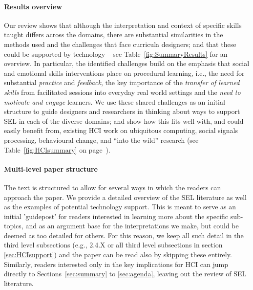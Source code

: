\documentclass[prodmode,acmtochi]{acmsmall}
\begin{document}
\paragraph{Results overview}
Our review shows that although the interpretation and context of specific skills taught differs across the domains, there are substantial similarities in the methods used and the challenges that face curricula designers; and that these could be supported by technology -- see Table~\ref{fig:SummaryResults} for an overview.  
%
In particular, the identified challenges build on the emphasis that social and emotional skills interventions place on procedural learning, i.e., the need for substantial \emph{practice} and \emph{feedback}, the key importance of the \emph{transfer of learned skills} from facilitated sessions into everyday real world settings and the \emph{need to motivate and engage} learners.
%
We use these shared challenges as an initial structure to guide designers and researchers in thinking about ways to support SEL in each of the diverse domains; and show how this fits well with, and could easily benefit from, existing HCI work on ubiquitous computing, social signals processing, behavioural change, and ``into the wild'' research (see Table~\ref{fig:HCIsummary} on page~\pageref{fig:HCIsummary}). 
%

\paragraph{Multi-level paper structure}
The text is structured to allow for several ways in which the readers can approach the paper. We provide a detailed overview of the SEL literature as well as the examples of potential technology support. This is meant to serve as an initial 'guidepost' for readers interested in learning more about the specific sub-topics, and as an argument base for the interpretations we make, but could be deemed as too detailed for others. For this reason, we keep all such detail in the third level subsections (e.g., 2.4.X or all third level subsections in section \ref{sec:HCIsupport}) and the paper can be read also by skipping these entirely. Similarly, readers interested only in the key implications for HCI can jump directly to Sections~\ref{sec:summary} to \ref{sec:agenda}, leaving out the review of SEL literature. 
\end{document}
